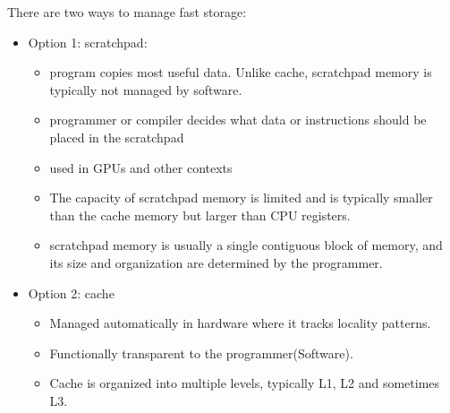\documentclass[letterpaper,12pt]{article}
\begin{document}
There are two ways to manage fast storage:
\begin{itemize}
    \item Option 1: scratchpad:
          \begin{itemize}
              \item program copies most useful data. Unlike cache, scratchpad memory is typically not managed by software.
              \item programmer or compiler decides what data or instructions should be placed in the scratchpad
              \item used in GPUs and other contexts
              \item The capacity of scratchpad memory is limited and is typically smaller than the cache memory but larger than CPU registers.
              \item scratchpad memory is usually a single contiguous block of memory, and its size and organization are determined by the programmer.
          \end{itemize}
    \item Option 2: cache
          \begin{itemize}
              \item Managed automatically in hardware where it tracks locality patterns.
              \item Functionally transparent to the programmer(Software).
              \item Cache is organized into multiple levels, typically L1, L2 and sometimes L3.
          \end{itemize}
\end{itemize}
\end{document}
